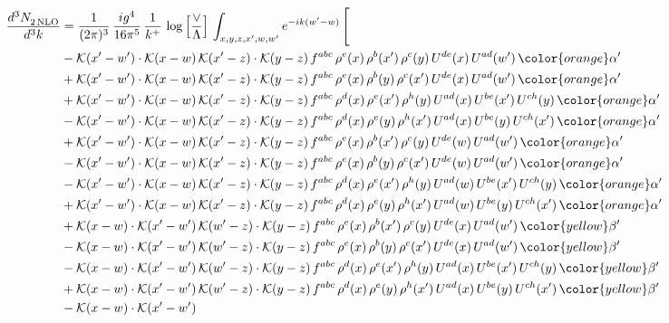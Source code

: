  \begin{align}   
     \frac{d^{3}N_{2\,\rm NLO}^{\rm}}{d^{3}k}  & = \frac{1}{(2\pi)^{3}}\, \frac{ig^{4}}{16\pi^{5}}\, \frac{1}{k^{+}}\, \log{\left[\frac{\vee}{\Lambda}\right]}\, \int_{x,y,z,x^{\prime},w,w^{\prime}}e^{-ik(w^{\prime}-w)}\, \Bigg[\notag \\ & - \mathcal{K}(x'-w')\cdot \mathcal{K}(x-w)\,\mathcal{K}(x'-z) \cdot \mathcal{K}(y-z)\, f^{abc}\,\rho^{e}(x)\,\rho^{b}(x')\,\rho^{c}(y)\,U^{de}(x)\,U^{ad}(w')\,{\color{orange} \alpha'} \notag \\ & +\mathcal{K}(x'-w')\cdot \mathcal{K}(x-w)\,\mathcal{K}(x'-z) \cdot \mathcal{K}(y-z)\, f^{abc}\,\rho^{e}(x)\,\rho^{b}(y)\,\rho^{c}(x')\,U^{de}(x)\,U^{ad}(w')\,{\color{orange} \alpha'} \notag \\ & + \mathcal{K}(x'-w')\cdot \mathcal{K}(x-w)\,\mathcal{K}(x'-z) \cdot \mathcal{K}(y-z)\, f^{abc}\,\rho^{d}(x)\,\rho^{e}(x')\,\rho^{h}(y)\,U^{ad}(x)\,U^{be}(x')\,U^{ch}(y)\,{\color{orange} \alpha'} \notag \\ & - \mathcal{K}(x'-w')\cdot \mathcal{K}(x-w)\,\mathcal{K}(x'-z) \cdot \mathcal{K}(y-z)\, f^{abc}\,\rho^{d}(x)\,\rho^{e}(y)\,\rho^{h}(x')\,U^{ad}(x)\,U^{be}(y)\,U^{ch}(x')\,{\color{orange} \alpha'} \notag \\ & + \mathcal{K}(x'-w')\cdot \mathcal{K}(x-w)\,\mathcal{K}(x'-z) \cdot \mathcal{K}(y-z)\, f^{abc}\,\rho^{e}(x)\,\rho^{b}(x')\,\rho^{c}(y)\,U^{de}(w)\,U^{ad}(w')\,{\color{orange} \alpha'} \notag \\ & - \mathcal{K}(x'-w')\cdot \mathcal{K}(x-w)\,\mathcal{K}(x'-z) \cdot \mathcal{K}(y-z)\, f^{abc}\,\rho^{e}(x)\,\rho^{b}(y)\,\rho^{c}(x')\,U^{de}(w)\,U^{ad}(w')\,{\color{orange} \alpha'} \notag \\ & - \mathcal{K}(x'-w')\cdot \mathcal{K}(x-w)\,\mathcal{K}(x'-z) \cdot \mathcal{K}(y-z)\, f^{abc}\,\rho^{d}(x)\,\rho^{e}(x')\,\rho^{h}(y)\,U^{ad}(w)\,U^{be}(x')\,U^{ch}(y)\,{\color{orange} \alpha'} \notag \\ &  + \mathcal{K}(x'-w')\cdot \mathcal{K}(x-w)\,\mathcal{K}(x'-z) \cdot \mathcal{K}(y-z)\, f^{abc}\,\rho^{d}(x)\,\rho^{e}(y)\,\rho^{h}(x')\,U^{ad}(w)\,U^{be}(y)\,U^{ch}(x')\,{\color{orange} \alpha'} \notag \\ & + \mathcal{K}(x-w) \cdot \mathcal{K}(x'-w')\, \mathcal{K}(w'-z) \cdot \mathcal{K}(y-z)\, f^{abc}\, \rho^{e}(x)\,\rho^{b}(x')\,\rho^{c}(y)\,U^{de}(x)\,U^{ad}(w')\, {\color{yellow} \beta'} \notag \\ & - \mathcal{K}(x-w) \cdot \mathcal{K}(x'-w')\, \mathcal{K}(w'-z) \cdot \mathcal{K}(y-z)\, f^{abc}\, \rho^{e}(x)\,\rho^{b}(y)\,\rho^{c}(x')\,U^{de}(x)\,U^{ad}(w')\, {\color{yellow} \beta'} \notag \\ &  - \mathcal{K}(x-w) \cdot \mathcal{K}(x'-w')\, \mathcal{K}(w'-z) \cdot \mathcal{K}(y-z)\, f^{abc}\, \rho^{d}(x)\,\rho^{e}(x')\,\rho^{h}(y)\,U^{ad}(x)\,U^{be}(x')\,U^{ch}(y)\, {\color{yellow} \beta'} \notag \\ &  + \mathcal{K}(x-w) \cdot \mathcal{K}(x'-w')\, \mathcal{K}(w'-z) \cdot \mathcal{K}(y-z)\, f^{abc}\, \rho^{d}(x)\,\rho^{e}(y)\,\rho^{h}(x')\,U^{ad}(x)\,U^{be}(y)\,U^{ch}(x')\, {\color{yellow} \beta'} \notag \\ &  - \mathcal{K}(x-w) \cdot \mathcal{K}(x'-w')\, 
\end{align}
